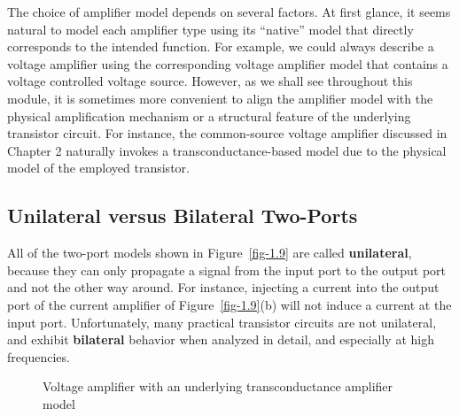 \documentclass[
  11pt,
  letterpaper,
  abstract]{scrbook}
\begin{document}
The choice of amplifier model depends on several factors. At first
glance, it seems natural to model each amplifier type using its
``native'' model that directly corresponds to the intended function. For
example, we could always describe a voltage amplifier using the
corresponding voltage amplifier model that contains a voltage controlled
voltage source. However, as we shall see throughout this module, it is
sometimes more convenient to align the amplifier model with the physical
amplification mechanism or a structural feature of the underlying
transistor circuit. For instance, the common-source voltage amplifier
discussed in Chapter 2 naturally invokes a transconductance-based model
due to the physical model of the employed transistor.

\subsection{Unilateral versus Bilateral
Two-Ports}\label{unilateral-versus-bilateral-two-ports}

All of the two-port models shown in Figure~\ref{fig-1.9} are called
\textbf{unilateral}, because they can only propagate a signal from the
input port to the output port and not the other way around. For
instance, injecting a current into the output port of the current
amplifier of Figure~\ref{fig-1.9}(b) will not induce a current at the
input port. Unfortunately, many practical transistor circuits are not
unilateral, and exhibit \textbf{bilateral} behavior when analyzed in
detail, and especially at high frequencies.

\begin{figure}


\caption{\label{fig-1.11}Voltage amplifier with an underlying
transconductance amplifier model}

\end{figure}%
\end{document}
